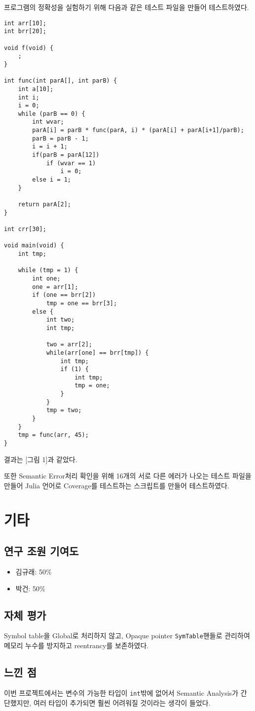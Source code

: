 \documentclass[a4paper, 10pt]{oblivoir}
\begin{document}
프로그램의 정확성을 실험하기 위해 다음과 같은 테스트 파일을 만들어 테스트하였다.
\begin{lstlisting}[frame=single, caption=\texttt{test1.c}, breaklines=true]
int arr[10];
int brr[20];

void f(void) {
    ;
}

int func(int parA[], int parB) {
    int a[10];
    int i;
    i = 0;
    while (parB == 0) {
        int wvar;
        parA[i] = parB * func(parA, i) * (parA[i] + parA[i+1]/parB);
        parB = parB - 1;
        i = i + 1;
        if(parB = parA[12])
            if (wvar == 1)
                i = 0;
        else i = 1;
    }

    return parA[2];
}

int crr[30];

void main(void) {
    int tmp;

    while (tmp = 1) {
        int one;
        one = arr[1];
        if (one == brr[2])
            tmp = one == brr[3];
        else {
            int two;
            int tmp;

            two = arr[2];
            while(arr[one] == brr[tmp]) {
                int tmp;
                if (1) {
                    int tmp;
                    tmp = one;
                }
            }
            tmp = two;
        }
    }
    tmp = func(arr, 45);
}
\end{lstlisting}

결과는 [그림 1]과 같았다.

또한 Semantic Error처리 확인을 위해 16개의 서로 다른 에러가 나오는 테스트 파일을 만들어 Julia 언어로 Coverage를 테스트하는 스크립트를 만들어 테스트하였다.

\section{기타}

\subsection{연구 조원 기여도}

\begin{itemize}
	\item 김규래: 50\%
	\item 박건: 50\%
\end{itemize}

\subsection{자체 평가}

Symbol table을 Global로 처리하지 않고, Opaque pointer \texttt{SymTable}핸들로 관리하여 메모리 누수를 방지하고 reentrancy를 보존하였다.

\subsection{느낀 점}

이번 프로젝트에서는 변수의 가능한 타입이 \texttt{int}밖에 없어서 Semantic Analysis가 간단했지만, 여러 타입이 추가되면 훨씬 어려워질 것이라는 생각이 들었다.
\end{document}
